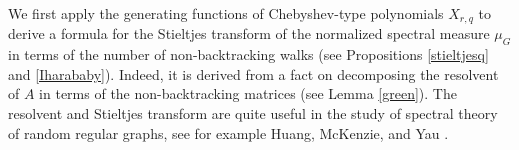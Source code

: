 \documentclass{article}
\begin{document}

We first apply the generating functions of Chebyshev-type polynomials $X_{r,q}$ to derive a formula for the Stieltjes transform of the normalized spectral measure $\mu_{G}$ in terms of the number of non-backtracking walks (see Propositions \ref{stieltjesq} and \ref{Iharababy}). Indeed, it is derived from a fact on decomposing the resolvent of $A$ in terms of the non-backtracking matrices (see Lemma \ref{green}). The resolvent and Stieltjes transform are quite useful in the study of spectral theory of random regular graphs, see for example Huang, McKenzie, and Yau \cite{HMY24}.
\end{document}
